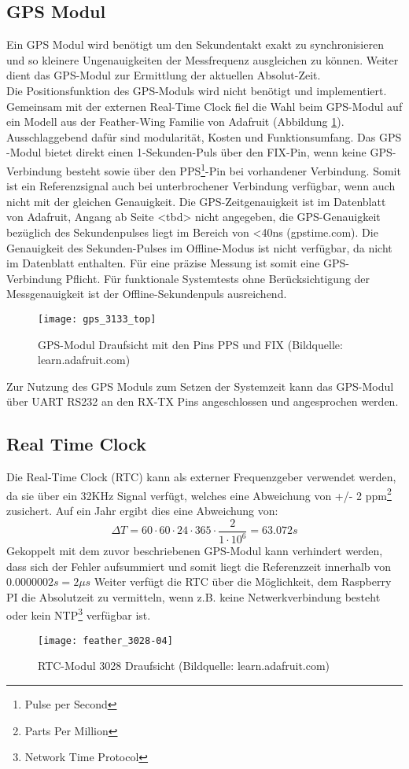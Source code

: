 \subsection{GPS Modul}
	Ein GPS Modul wird benötigt um den Sekundentakt exakt zu synchronisieren und so kleinere Ungenauigkeiten der Messfrequenz ausgleichen zu können. Weiter dient das GPS-Modul zur Ermittlung der aktuellen Absolut-Zeit.\\
	Die Positionsfunktion des GPS-Moduls wird nicht benötigt und implementiert. Gemeinsam mit der externen Real-Time Clock fiel die Wahl beim GPS-Modul auf ein Modell aus der Feather-Wing Familie von Adafruit (Abbildung \ref{fig:GPS3133}).
    Ausschlaggebend dafür sind modularität, Kosten und Funktionsumfang. Das GPS -Modul bietet direkt einen 1-Sekunden-Puls über den FIX-Pin, wenn keine GPS-Verbindung besteht sowie über den PPS\footnote{Pulse per Second}-Pin bei vorhandener Verbindung. Somit ist ein Referenzsignal auch bei unterbrochener Verbindung verfügbar, wenn auch nicht mit der gleichen Genauigkeit. Die GPS-Zeitgenauigkeit ist im Datenblatt von Adafruit, Angang ab Seite <tbd> nicht angegeben, die GPS-Genauigkeit bezüglich des Sekundenpulses liegt im Bereich von <40ns (gpstime.com). Die Genauigkeit des Sekunden-Pulses im Offline-Modus ist nicht verfügbar, da nicht im Datenblatt enthalten. Für eine präzise Messung ist somit eine GPS-Verbindung Pflicht. Für funktionale Systemtests ohne Berücksichtigung der Messgenauigkeit ist der Offline-Sekundenpuls ausreichend.
		\begin{figure}[H]
        	\centering
        	\texttt{[image: gps\_3133\_top]}
        	\caption{GPS-Modul Draufsicht mit den Pins PPS und FIX (Bildquelle: learn.adafruit.com)}
        	\label{fig:GPS3133}
    	\end{figure}
	\noindent Zur Nutzung des GPS Moduls zum Setzen der Systemzeit kann das GPS-Modul über UART RS232 an den RX-TX Pins angeschlossen und angesprochen werden.
%
%	
\subsection{Real Time Clock}
\label{cap:RTC}
	Die Real-Time Clock (RTC) kann als externer Frequenzgeber verwendet werden, da sie über ein 32KHz Signal verfügt, welches eine Abweichung von +/- 2 ppm\footnote{Parts Per Million} zusichert. Auf ein Jahr ergibt dies eine Abweichung von:
	\[
		\Delta{T} = 60 \cdot 60 \cdot 24 \cdot 365 \cdot \frac{2}{1\cdot 10^6} = 63.072s
	\]
	Gekoppelt mit dem zuvor beschriebenen GPS-Modul kann verhindert werden, dass sich der Fehler aufsummiert und somit liegt die Referenzzeit innerhalb von $0.0000002s = 2\mu{s}$ 
	Weiter verfügt die RTC über die Möglichkeit, dem Raspberry PI die Absolutzeit zu vermitteln, wenn z.B. keine Netwerkverbindung besteht oder kein NTP\footnote{Network Time Protocol} verfügbar ist.
		\begin{figure}[H]
        	\centering
        	\texttt{[image: feather\_3028-04]}
        	\caption{RTC-Modul 3028 Draufsicht (Bildquelle: learn.adafruit.com)}
        	\label{fig:RTC3028}
    	\end{figure}
%
%
